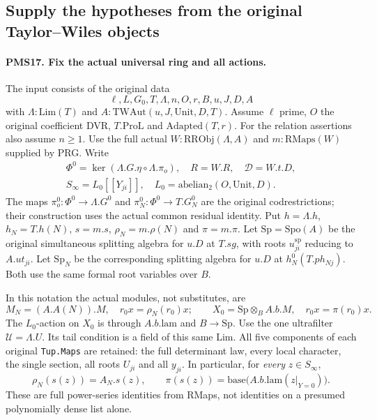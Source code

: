 \subsection{Supply the hypotheses from the original Taylor--Wiles objects}

\paragraph{PMS17. Fix the actual universal ring and all actions.}
\label{claim:PMS17}
The input consists of the original data
\[
 \ell,L,G_0,T,\Lambda,n,O,r,B,u,J,D,A
\]
with $\Lambda:\mathrm{Lim}(T)$ and
$A:\mathrm{TWAut}(u,J,\mathrm{Unit},D,T)$.
Assume $\ell$ prime, $O$ the original coefficient DVR,
$T.\mathrm{ProL}$ and $\mathrm{Adapted}(T,r)$.
For the relation assertions also assume $n\geq1$.
Use the full actual $W:\mathrm{RRObj}(\Lambda,A)$ and
$m:\mathrm{RMaps}(W)$ supplied by PRG.
Write
\[
 \begin{gathered}
 \Phi^0=\ker(\Lambda.G.\eta\circ\Lambda.\pi_o),\quad
 R=W.R,\quad\mathcal D=W.t.D,\\
 S_\infty=L_0[[Y_{ji}]],\quad
 L_0=\mathrm{abelian}_2(O,\mathrm{Unit},D).
 \end{gathered}
                                                        \tag{PMS.30}
\]
The maps $\pi_o^0:\Phi^0\to\Lambda.G^0$ and
$\pi_N^0:\Phi^0\to T.G_N^0$ are the original codrestrictions;
their construction uses the actual common residual identity.
Put $h=\Lambda.h$, $h_N=T.h(N)$, $s=m.s$,
$\rho_N=m.\rho(N)$ and $\pi=m.\pi$.
Let $\mathrm{Sp}=\mathrm{Spo}(A)$ be the original simultaneous
splitting algebra for $u.D$ at $T.sg$, with roots
$u^\mathrm{sp}_{ji}$ reducing to $A.ut_{ji}$.
Let $\mathrm{Sp}_N$ be the corresponding splitting algebra for
$u.D$ at $h_N^0(T.ph_{Nj})$.
Both use the same formal root variables over $B$.

In this notation the actual modules, not substitutes, are
\[
 M_N=(A.A(N)).M,\quad r_0x=\rho_N(r_0)x;
 \qquad X_0=\mathrm{Sp}\otimes_B A.b.M,\quad
 r_0x=\pi(r_0)x.                                  \tag{PMS.31}
\]
The $L_0$-action on $X_0$ is through $A.b.\mathrm{lam}$ and
$B\to\mathrm{Sp}$.  Use the one ultrafilter $\mathscr U=\Lambda.U$.
Its tail condition is a field of this same Lim.
All five components of each original \texttt{Tup.Maps} are
retained: the full determinant law, every local character, the
single section, all roots $U_{ji}$ and all $y_{ji}$.
In particular, for \emph{every} $z\in S_\infty$,
\[
 \rho_N(s(z))=A_N.s(z),\qquad
 \pi(s(z))=\mathrm{base}\bigl(A.b.\mathrm{lam}(z|_{Y=0})\bigr).
                                                        \tag{PMS.32}
\]
These are full power-series identities from RMaps, not identities
on a presumed polynomially dense list alone.

